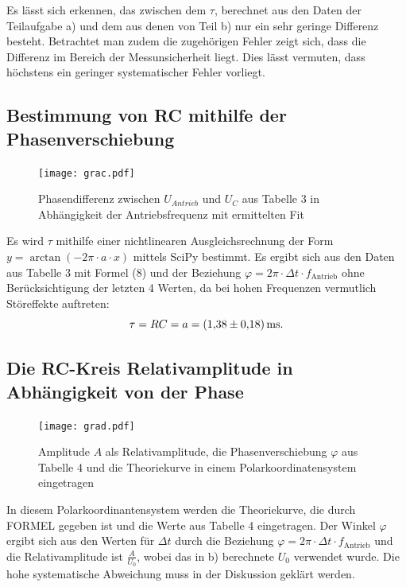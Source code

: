 Es lässt sich erkennen, das zwischen dem $\tau$, berechnet aus den Daten der
 Teilaufgabe a) und dem aus denen von Teil b) nur ein sehr geringe Differenz
  besteht. Betrachtet man zudem die zugehörigen Fehler zeigt sich, dass die
	Differenz im Bereich der Messunsicherheit liegt. Dies lässt vermuten, dass höchstens ein geringer systematischer Fehler vorliegt.

\subsection{Bestimmung von RC mithilfe der Phasenverschiebung}
	 \begin{figure}[H]
	 	\centering
	 	\caption{Phasendifferenz zwischen $U_{Antrieb}$ und $U_C$ aus Tabelle 3 in Abhängigkeit der Antriebsfrequenz mit ermittelten Fit}
	 	\texttt{[image: grac.pdf]}
	 	\label{fig:grac}
	 \end{figure}
	 
	 Es wird $\tau$ mithilfe einer nichtlinearen Ausgleichsrechnung der Form $y = \arctan(-2\pi \cdot a \cdot x)$ mittels SciPy \cite{scipy} bestimmt. Es ergibt sich aus den Daten aus Tabelle 3 mit Formel (8) und der Beziehung $\varphi=2\pi \cdot \Delta t \cdot f_{\text{Antrieb}}$ ohne Berücksichtigung der letzten 4 Werten, da bei hohen Frequenzen vermutlich Störeffekte auftreten:
	 \begin{displaymath}
	 \tau = RC = a = \SI{1.38 \pm 0.18}{\milli\second}\text{.}
	 \end{displaymath}


	 \subsection{Die RC-Kreis Relativamplitude in Abhängigkeit von der Phase}

	 \begin{figure}[H]
	  \centering
	  \caption{Amplitude $A$ als Relativamplitude, die Phasenverschiebung $\varphi$ aus Tabelle 4 und die Theoriekurve in einem Polarkoordinatensystem eingetragen}
	  \texttt{[image: grad.pdf]}
	  \label{fig:grad}
	 \end{figure}
	 
	 In diesem Polarkoordinantensystem werden die Theoriekurve, die durch FORMEL gegeben ist und die Werte aus Tabelle 4 eingetragen. Der Winkel $\varphi$ ergibt sich aus den Werten für $\Delta t$ durch die Beziehung $\varphi=2\pi \cdot \Delta t \cdot f_{\text{Antrieb}}$ und die Relativamplitude ist $\frac{A}{U_{0}}$, wobei das in b) berechnete $U_{0}$ verwendet wurde. Die hohe systematische Abweichung muss in der Diskussion geklärt werden.



